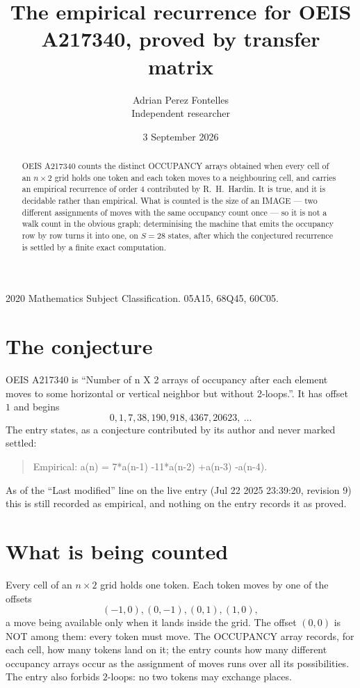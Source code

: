 \documentclass[11pt,a4paper]{article}
\title{The empirical recurrence for OEIS A217340, proved by transfer matrix}
\author{Adrian Perez Fontelles\\ \small Independent researcher}
\date{3 September 2026}
\theoremstyle{plain}
\theoremstyle{definition}
\begin{document}
\maketitle

\begin{abstract}
OEIS A217340 counts the distinct OCCUPANCY arrays obtained when every cell of an $n\times2$ grid
holds one token and each token moves to a neighbouring cell, and carries an empirical
recurrence of order $4$ contributed by R.~H.~Hardin. It is true, and it is decidable
rather than empirical. What is counted is the size of an IMAGE --- two different assignments of
moves with the same occupancy count once --- so it is not a walk count in the obvious graph;
determinising the machine that emits the occupancy row by row turns it into one, on $S=28$
states, after which the conjectured recurrence is settled by a finite exact computation.
\end{abstract}

\noindent\small 2020 Mathematics Subject Classification. 05A15, 68Q45, 60C05.\normalsize

\section{The conjecture}

OEIS A217340 is ``Number of n X 2 arrays of occupancy after each element moves to some horizontal or vertical neighbor but without 2-loops.''. It has offset $1$ and begins
\[
0, 1, 7, 38, 190, 918, 4367, 20623,\ \dots
\]
The entry states, as a conjecture contributed by its author and never marked settled:
\begin{quote}
Empirical: a(n) = 7*a(n-1) -11*a(n-2) +a(n-3) -a(n-4).
\end{quote}
As of the ``Last modified'' line on the live entry (Jul 22 2025 23:39:20, revision 9) this is still
recorded as empirical, and nothing on the entry records it as proved.

\section{What is being counted}

Every cell of an $n\times2$ grid holds one token. Each token moves by one of the offsets
\[
(-1,0), (0,-1), (0,1), (1,0),
\]
a move being available only when it lands inside the grid. The offset $(0,0)$ is NOT among them: every token must move. The OCCUPANCY array
records, for each cell, how many tokens land on it; the entry counts how many different
occupancy arrays occur as the assignment of moves runs over all its possibilities. The entry also forbids $2$-loops: no two tokens may exchange places.
\end{document}
